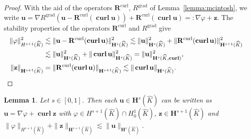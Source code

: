 \documentclass{article}
\newtheorem{lemma}[theorem]{Lemma}
\begin{document}
\begin{proof}
With the aid of the operators ${\mathbf{R}}^{\operatorname*{curl}}$,
$R^{\operatorname*{grad}}$ of Lemma~\ref{lemma:mcintosh}, we write
$\displaystyle 
{\mathbf{u}}=\nabla R^{\operatorname*{grad}}({\mathbf{u}}-{\mathbf{R}%
}^{\operatorname*{curl}}(\operatorname*{\mathbf{curl}}{\mathbf{u}}))+{\mathbf{R}%
}^{\operatorname*{curl}}(\operatorname*{\mathbf{curl}}{\mathbf{u}})
=:\nabla \varphi + {\mathbf z}.
$
The stability properties of the operators $\mathbf{R}^{\operatorname{curl}}$ and $R^{\operatorname{grad}}$ 
give 
\begin{align*}
\Vert\varphi\Vert_{H^{s+1}(\widehat{K})}^2 &\lesssim \Vert\mathbf{u}-\mathbf{R}^{\operatorname{curl}}(\operatorname{\mathbf{curl}}\mathbf{u})\Vert_{\mathbf{H}^s(\widehat{K})}^2 \lesssim \Vert\mathbf{u}\Vert_{\mathbf{H}^s(\widehat{K})}^2 + \Vert\mathbf{R}^{\operatorname{curl}}(\operatorname{\mathbf{curl}}\mathbf{u})\Vert_{\mathbf{H}^{s+1}(\widehat{K})}^2 \\
&\lesssim \Vert\mathbf{u}\Vert_{\mathbf{H}^s(\widehat{K})}^2 + \Vert\operatorname{\mathbf{curl}}\mathbf{u}\Vert_{\mathbf{H}^s(\widehat{K})}^2 = \Vert\mathbf{u}\Vert_{\mathbf{H}^s(\widehat{K},\operatorname{\mathbf{curl}})}^2,\\
\Vert\mathbf{z}\Vert_{\mathbf{H}^{s+1}(\widehat{K})} &= \Vert\mathbf{R}^{\operatorname{curl}}(\operatorname{\mathbf{curl}}\mathbf{u})\Vert_{\mathbf{H}^{s+1}(\widehat{K})} \lesssim \Vert\operatorname{\mathbf{curl}}\mathbf{u}\Vert_{\mathbf{H}^s(\widehat{K})}.
\qedhere
\end{align*}
\end{proof}
\begin{lemma}
\label{lemma:helmholtz-like-decomp-v2} Let $s \in [0,1]$. Then each ${\mathbf{u}}
\in{\mathbf{H}}^{s}(\widehat{K})$ can be written as
${\mathbf{u}} = \nabla\varphi+ \operatorname{\mathbf{curl}}\mathbf{z}$ with $\varphi\in H^{s+1}%
(\widehat{K}) \cap H^1_0(\widehat{K})$, $\mathbf{z} \in \mathbf{H}^{s+1}(\widehat{K})$ and 
$\|\varphi\|_{H^{s+1}(\widehat{K})} + \|\mathbf{z}\|_{{\mathbf H}^{s+1}(\widehat{K})} \lesssim \|\mathbf{u}\|_{\mathbf{H}^s(\widehat{K})}$.  
\end{lemma}
\end{document}
